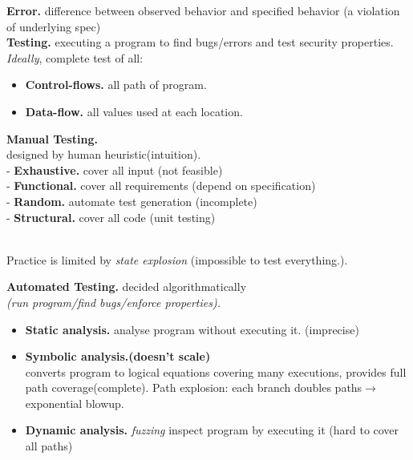 \documentclass[9pt, a4paper]{extarticle}
\begin{document}
\begin{minipage}[t]{0.5\textwidth}
	\begin{minipage}[t]{0.495\textwidth}
		\textbf{Error.} difference between observed behavior and specified behavior (a violation of underlying spec)\\
		\textbf{Testing.} executing a program to find bugs/errors and test security properties.\\
		\textit{Ideally}, complete test of all:
		\begin{itemize}
			\item[-] \textbf{Control-flows.} all path of program.
			\item[-] \textbf{Data-flow.} all values used at each location.
		\end{itemize}
	\end{minipage}\hfill\vline\hfill
	\begin{minipage}[t]{0.5\textwidth}
		\textbf{Manual Testing.}\\
		designed by human heuristic(intuition).\\
		-	\textbf{Exhaustive.} cover all input (not feasible)\\
		- \textbf{Functional.} cover all requirements (depend on specification)\\
		- \textbf{Random.} automate test generation (incomplete)\\
		- \textbf{Structural.} cover all code (unit testing)
	\end{minipage}\\
	Practice is limited by \textit{state explosion} (impossible to test everything.).\\
	\begin{minipage}[htp]{0.51\textwidth}
		\textbf{Automated Testing.} decided algorithmatically\\
		\textit{(run program/find bugs/enforce properties).}
		\begin{itemize}[leftmargin=4pt, labelsep=1pt]
			\item[-] \textbf{Static analysis.} analyse program without executing it. (imprecise)
			\item[-] \textbf{Symbolic analysis.(doesn't scale)} \\converts program to logical equations covering many executions, provides full path coverage(complete). Path explosion: each branch doubles paths$\rightarrow$exponential blowup.
			\item[-] \textbf{Dynamic analysis.} \textit{fuzzing} inspect program by executing it (hard to cover all paths)

\end{itemize}
\end{minipage}
\end{minipage}
\end{document}
